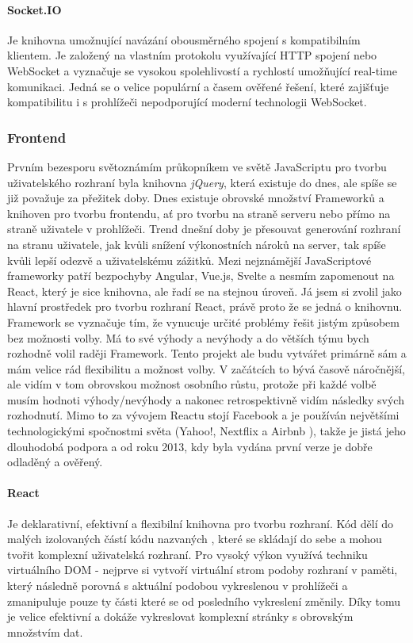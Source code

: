 \paragraph{Socket.IO}\label{socketio} Je knihovna umožnující navázání obousměrného spojení s kompatibilním klientem. Je založený na vlastním protokolu využívající HTTP spojení nebo WebSocket a vyznačuje se vysokou spolehlivostí a rychlostí umožňující real-time komunikaci. Jedná se o velice populární a časem ověřené řešení, které zajišťuje kompatibilitu i s prohlížeči nepodporující moderní technologii WebSocket.


\subsubsection{Frontend}
Prvním bezesporu světoznámím průkopníkem ve světě JavaScriptu pro tvorbu uživatelského rozhraní byla knihovna \textit{jQuery}, která existuje do dnes, ale spíše se již považuje za přežitek doby. Dnes existuje obrovské množství Frameworků a knihoven pro tvorbu frontendu, ať pro tvorbu na straně serveru nebo přímo na straně uživatele v prohlížeči. Trend dnešní doby je přesouvat generování rozhraní na stranu uživatele, jak kvůli snížení výkonostních nároků na server, tak spíše kvůli lepší odezvě a uživatelskému zážitků. Mezi nejznámější JavaScriptové frameworky patří bezpochyby Angular, Vue.js, Svelte a nesmím zapomenout na React, který je sice knihovna, ale řadí se na stejnou úroveň. Já jsem si zvolil jako hlavní prostředek pro tvorbu rozhraní React, právě proto že se jedná o knihovnu. Framework se vyznačuje tím, že vynucuje určité problémy řešit jistým způsobem bez možnosti volby. Má to své výhody a nevýhody a do větších týmu bych rozhodně volil raději Framework. Tento projekt ale budu vytvářet primárně sám a mám velice rád flexibilitu a možnost volby. V začátcích to bývá časově náročnější, ale vidím v tom obrovskou možnost osobního růstu, protože při každé volbě musím hodnoti výhody/nevýhody a nakonec retrospektivně vidím následky svých rozhodnutí. Mimo to za vývojem Reactu stojí Facebook a je používán největšími technologickými spočnostmi světa (Yahoo!, Nextflix a Airbnb \cite{react-companies}), takže je jistá jeho dlouhodobá podpora a od roku 2013, kdy byla vydána první verze je dobře odladěný a ověřený.

\paragraph{React} Je deklarativní, efektivní a flexibilní knihovna pro tvorbu rozhraní. Kód dělí do malých izolovaných částí kódu nazvaných , které se skládají do sebe a mohou tvořit komplexní uživatelská rozhraní. Pro vysoký výkon využívá techniku virtuálního DOM - nejprve si vytvoří virtuální strom podoby rozhraní v paměti, který následně porovná s aktuální podobou vykreslenou v prohlížeči a zmanipuluje pouze ty části které se od posledního vykreslení změnily. Díky tomu je velice efektivní a dokáže vykreslovat komplexní stránky s obrovským množstvím dat. \cite{react}


